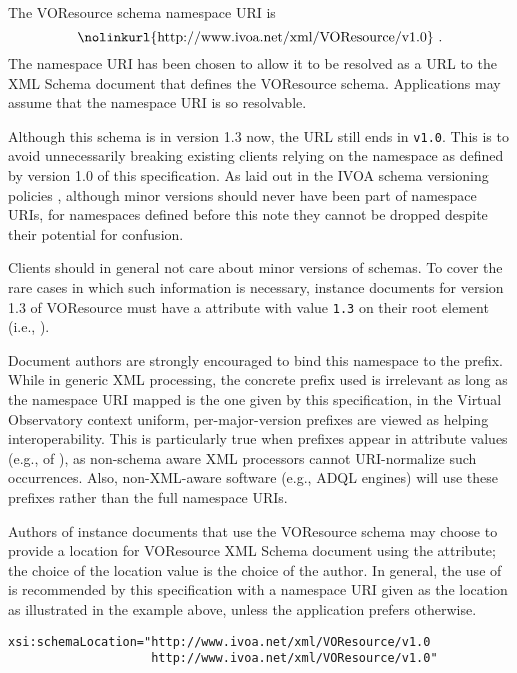 \documentclass[11pt,a4paper]{ivoa}
\begin{document}
\label{sect:namespace}


The VOResource schema namespace URI is
$$\hbox{\nolinkurl{http://www.ivoa.net/xml/VOResource/v1.0}}\,\,.$$
The namespace URI has been chosen to allow it to be resolved as a URL
to the XML Schema document that defines the VOResource schema.
Applications may assume that the namespace URI is so resolvable.

Although this schema is in version 1.3 now, the URL still ends in
\texttt{v1.0}.  This is to avoid unnecessarily breaking existing clients
relying on the namespace as defined by version 1.0 of this
specification.  As laid out in the IVOA schema versioning policies
\citep{2018ivoa.spec.0529H}, although minor versions should never have
been part of namespace URIs, for namespaces defined before this note
they cannot be dropped despite their potential for confusion.

Clients should in general not care about minor versions of schemas.
To cover
the rare cases in which  such information is necessary, instance documents
for version 1.3 of VOResource must have a  attribute
with value \texttt{1.3} on their root element (i.e., ).

Document authors are strongly encouraged to bind this namespace to the
 prefix.  While in generic XML processing, the concrete
prefix used is irrelevant as long as the namespace URI mapped is the one
given by this specification, in the Virtual Observatory context uniform,
per-major-version prefixes are viewed as helping interoperability.  This
is particularly true when prefixes appear in attribute values (e.g.,
of ), as non-schema aware XML processors cannot
URI-normalize such occurrences.  Also, non-XML-aware software (e.g., ADQL
engines) will use these prefixes rather than the full namespace URIs.

Authors of instance documents that use the VOResource schema may choose
to provide a location for VOResource XML Schema document using the
 attribute; the choice of the location value
is the choice of the author.  In general, the use of
 is recommended by this specification with
a namespace URI given as the location as illustrated in the example
above, unless the application prefers otherwise.


\begin{verbatim}
xsi:schemaLocation="http://www.ivoa.net/xml/VOResource/v1.0
                    http://www.ivoa.net/xml/VOResource/v1.0"
\end{verbatim}
\end{document}
